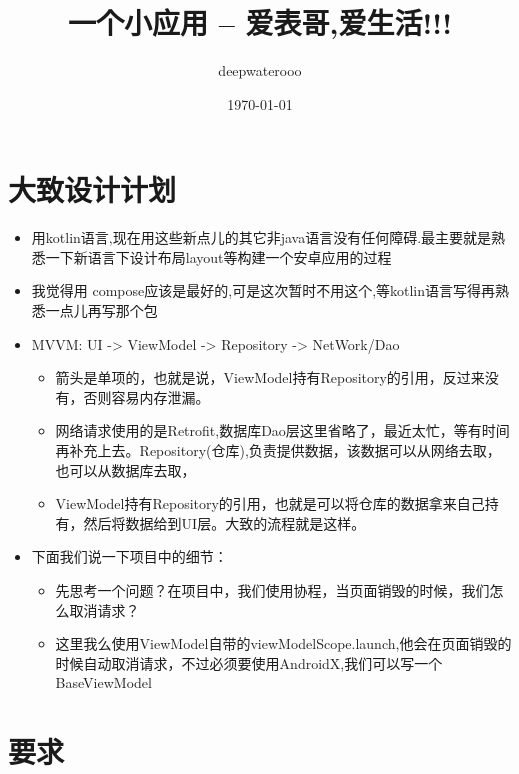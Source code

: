 \documentclass[9pt, b5paper]{article}
\author{deepwaterooo}
\date{\today}
\title{一个小应用 -- 爱表哥,爱生活!!!}
\begin{document}
\maketitle
\tableofcontents


\section{大致设计计划}
\label{sec-1}
\begin{itemize}
\item 用kotlin语言,现在用这些新点儿的其它非java语言没有任何障碍.最主要就是熟悉一下新语言下设计布局layout等构建一个安卓应用的过程
\item 我觉得用 compose应该是最好的,可是这次暂时不用这个,等kotlin语言写得再熟悉一点儿再写那个包
\item MVVM: UI -> ViewModel -> Repository -> NetWork/Dao
\begin{itemize}
\item 箭头是单项的，也就是说，ViewModel持有Repository的引用，反过来没有，否则容易内存泄漏。
\item 网络请求使用的是Retrofit,数据库Dao层这里省略了，最近太忙，等有时间再补充上去。Repository(仓库),负责提供数据，该数据可以从网络去取，也可以从数据库去取，
\item ViewModel持有Repository的引用，也就是可以将仓库的数据拿来自己持有，然后将数据给到UI层。大致的流程就是这样。
\end{itemize}
\item 下面我们说一下项目中的细节：
\begin{itemize}
\item 先思考一个问题？在项目中，我们使用协程，当页面销毁的时候，我们怎么取消请求？
\item 这里我么使用ViewModel自带的viewModelScope.launch,他会在页面销毁的时候自动取消请求，不过必须要使用AndroidX,我们可以写一个BaseViewModel
\end{itemize}
\end{itemize}

\section{要求}
\label{sec-2}
\end{document}
